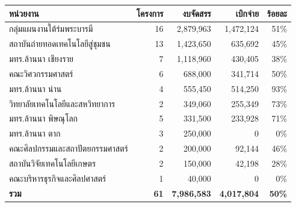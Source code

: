 \begin{center}\small
\setlength{\tabcolsep}{6pt}\renewcommand{\arraystretch}{1.3}
\begin{tabular}{p{6.6cm}rrrr}
\toprule
\rowcolor{rpfnavy!12}
\textbf{หน่วยงาน} & \textbf{โครงการ} & \textbf{งบจัดสรร} & \textbf{เบิกจ่าย} & \textbf{ร้อยละ}\\
\midrule
กลุ่มแผนงานใต้ร่มพระบารมี & 16 & 2,879,963 & 1,472,124 & 51\%\\
สถาบันถ่ายทอดเทคโนโลยีสู่ชุมชน & 13 & 1,423,650 & 635,692 & 45\%\\
มทร.ล้านนา เชียงราย & 7 & 1,118,960 & 430,405 & 38\%\\
คณะวิศวกรรมศาสตร์ & 6 & 688,000 & 341,714 & 50\%\\
มทร.ล้านนา น่าน & 4 & 555,450 & 514,250 & 93\%\\
วิทยาลัยเทคโนโลยีและสหวิทยาการ & 2 & 349,060 & 255,349 & 73\%\\
มทร.ล้านนา พิษณุโลก & 5 & 331,500 & 233,928 & 71\%\\
มทร.ล้านนา ตาก & 3 & 250,000 & 0 & 0\%\\
คณะศิลปกรรมและสถาปัตยกรรมศาสตร์ & 2 & 200,000 & 92,144 & 46\%\\
สถาบันวิจัยเทคโนโลยีเกษตร & 2 & 150,000 & 42,198 & 28\%\\
คณะบริหารธุรกิจและศิลปศาสตร์ & 1 & 40,000 & 0 & 0\%\\
\midrule
\rowcolor{rpfgold!15}
\textbf{รวม} & \textbf{61} & \textbf{7,986,583} & \textbf{4,017,804} & \textbf{50\%}\\
\bottomrule
\end{tabular}
\end{center}
